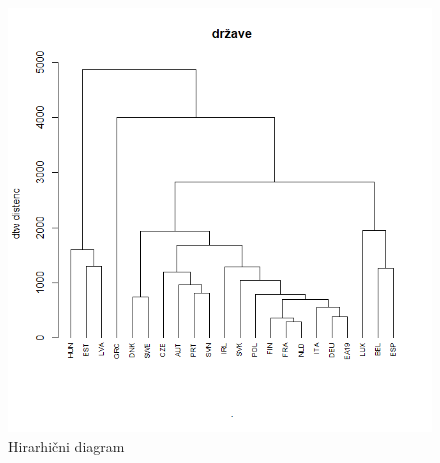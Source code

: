 \documentclass[12pt,a4paper]{article}
\begin{document}
\begin{figure}[h!]
    \centering
    \includegraphics[scale=0.45]{slike/hirar.png}
    \caption{Hirarhični diagram}
\end{figure}
\end{document}

